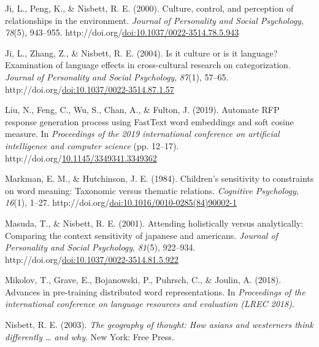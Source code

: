 \documentclass[10pt, letterpaper]{article}
\newenvironment{CSLReferences}%
  {}%
  {\par}
\begin{document}
\begin{CSLReferences}{1}{0}
\leavevmode{}%
Ji, L., Peng, K., \& Nisbett, R. E. (2000). Culture, control, and
perception of relationships in the environment. \emph{Journal of
Personality and Social Psychology}, \emph{78}(5), 943--955.
http://doi.org/\href{https://doi.org/doi:10.1037/0022-3514.78.5.943}{doi:10.1037/0022-3514.78.5.943}

\leavevmode{}%
Ji, L., Zhang, Z., \& Nisbett, R. E. (2004). Is it culture or is it
language? Examination of language effects in cross-cultural research on
categorization. \emph{Journal of Personality and Social Psychology},
\emph{87}(1), 57--65.
http://doi.org/\href{https://doi.org/doi:10.1037/0022-3514.87.1.57}{doi:10.1037/0022-3514.87.1.57}

\leavevmode{}%
Liu, N., Feng, C., Wu, S., Chan, A., \& Fulton, J. (2019). Automate RFP
response generation process using FastText word embeddings and soft
cosine measure. In \emph{Proceedings of the 2019 international
conference on artificial intelligence and computer science} (pp.
12--17).
http://doi.org/\href{https://doi.org/10.1145/3349341.3349362}{10.1145/3349341.3349362}

\leavevmode{}%
Markman, E. M., \& Hutchinson, J. E. (1984). Children's sensitivity to
constraints on word meaning: Taxonomic versus thematic relations.
\emph{Cognitive Psychology}, \emph{16}(1), 1--27.
http://doi.org/\href{https://doi.org/doi:10.1016/0010-0285(84)90002-1}{doi:10.1016/0010-0285(84)90002-1}

\leavevmode{}%
Masuda, T., \& Nisbett, R. E. (2001). Attending holistically versus
analytically: Comparing the context sensitivity of japanese and
americans. \emph{Journal of Personality and Social Psychology},
\emph{81}(5), 922--934.
http://doi.org/\href{https://doi.org/doi:10.1037/0022-3514.81.5.922}{doi:10.1037/0022-3514.81.5.922}

\leavevmode{}%
Mikolov, T., Grave, E., Bojanowski, P., Puhrsch, C., \& Joulin, A.
(2018). Advances in pre-training distributed word representations. In
\emph{Proceedings of the international conference on language resources
and evaluation (LREC 2018)}.

\leavevmode{}%
Nisbett, R. E. (2003). \emph{The geography of thought: How asians and
westerners think differently \ldots{} and why}. New York: Free Press.


\end{CSLReferences}
\end{document}
